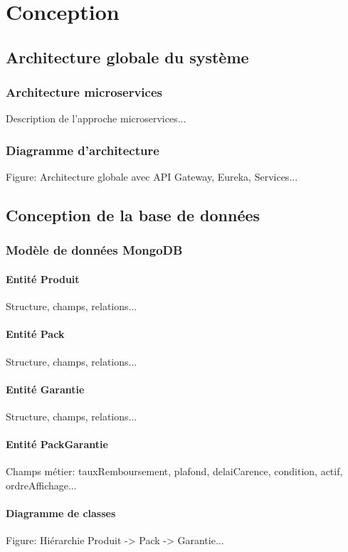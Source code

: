\documentclass[12pt,a4paper]{report}
\begin{document}
\chapter{Conception}
\label{chap:conception}

\section{Architecture globale du système}
\subsection{Architecture microservices}
Description de l'approche microservices...

\subsection{Diagramme d'architecture}
Figure: Architecture globale avec API Gateway, Eureka, Services...

\section{Conception de la base de données}
\subsection{Modèle de données MongoDB}
\subsubsection{Entité Produit}
Structure, champs, relations...

\subsubsection{Entité Pack}
Structure, champs, relations...

\subsubsection{Entité Garantie}
Structure, champs, relations...

\subsubsection{Entité PackGarantie}
Champs métier: tauxRemboursement, plafond, delaiCarence, condition, actif, ordreAffichage...

\subsubsection{Diagramme de classes}
Figure: Hiérarchie Produit -> Pack -> Garantie...
\end{document}
